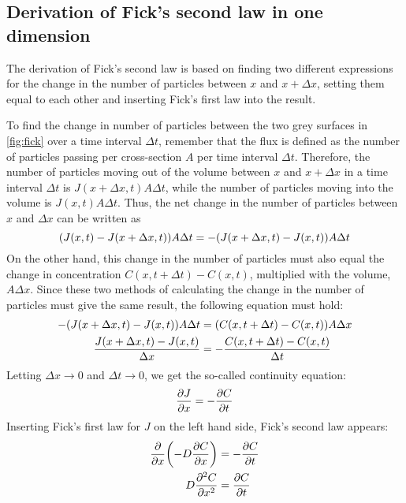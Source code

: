 \subsection{Derivation of Fick's second law in one dimension}
The derivation of Fick's second law is based on finding two different expressions for the change in the number of particles between \(x\) and \(x+\Delta x\), setting them equal to each other and inserting Fick's first law into the result.

To find the change in number of particles between the two grey surfaces in \vref{fig:fick} over a time interval \(\Delta t\), remember that the flux is defined as the number of particles passing per cross-section \(A\) per time interval \(\Delta t\). Therefore, the number of particles moving out of the volume between \(x\) and \(x+\Delta x\) in a time interval \(\Delta t\) is \(J(x+\Delta x,t)A\Delta t\), while the number of particles moving into the volume is \(J(x,t)A\Delta t\). Thus, the net change in the number of particles between \(x\) and \(\Delta x\) can be written as
\[
    \qty(J(x,t) - J(x + \Delta x,t))A\Delta t = -\qty(J(x+\Delta x,t) - J(x,t))A\Delta t
\]
On the other hand, this change in the number of particles must also equal the change in concentration \(C(x,t+\Delta t) - C(x,t)\), multiplied with the volume, \(A\Delta x\). Since these two methods of calculating the change in the number of particles must give the same result, the following equation must hold:
\begin{alignat*}{2}
    -\qty(J(x+\Delta x,t) - J(x,t))A\Delta t &= \qty(C(x,t+\Delta t) - C(x,t)) A\Delta x\\
    \frac{J(x+\Delta x,t) - J(x,t)}{\Delta x} &= -\frac{C(x,t+\Delta t) - C(x,t)}{\Delta t}
\end{alignat*}
Letting \(\Delta x\to0\) and \(\Delta t\to0\), we get the so-called continuity equation:
\[
    \pdv{J}{x} = -\pdv{C}{t}
\]
Inserting Fick's first law for \(J\) on the left hand side, Fick's second law appears:
\begin{alignat*}{2}
    \pdv{x}\qty(-D\pdv{C}{x}) &= -\pdv{C}{t}\\
    D\pdv[2]{C}{x} &= \pdv{C}{t}
\end{alignat*}


